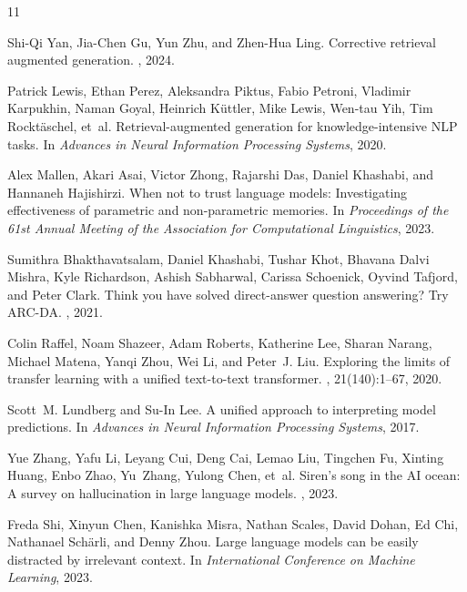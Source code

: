 \documentclass[11pt]{article}
\begin{document}
\begin{thebibliography}{11}

Shi-Qi Yan, Jia-Chen Gu, Yun Zhu, and Zhen-Hua Ling.
\newblock Corrective retrieval augmented generation.
, 2024.

Patrick Lewis, Ethan Perez, Aleksandra Piktus, Fabio Petroni, Vladimir Karpukhin, Naman Goyal,
Heinrich K\"{u}ttler, Mike Lewis, Wen-tau Yih, Tim Rockt\"{a}schel, et~al.
\newblock Retrieval-augmented generation for knowledge-intensive {NLP} tasks.
\newblock In {\em Advances in Neural Information Processing Systems}, 2020.

Alex Mallen, Akari Asai, Victor Zhong, Rajarshi Das, Daniel Khashabi, and Hannaneh Hajishirzi.
\newblock When not to trust language models: Investigating effectiveness of parametric and
  non-parametric memories.
\newblock In {\em Proceedings of the 61st Annual Meeting of the Association for Computational
  Linguistics}, 2023.

Sumithra Bhakthavatsalam, Daniel Khashabi, Tushar Khot, Bhavana Dalvi Mishra, Kyle Richardson,
Ashish Sabharwal, Carissa Schoenick, Oyvind Tafjord, and Peter Clark.
\newblock Think you have solved direct-answer question answering? {T}ry {ARC-DA}.
, 2021.

Colin Raffel, Noam Shazeer, Adam Roberts, Katherine Lee, Sharan Narang, Michael Matena, Yanqi
Zhou, Wei Li, and Peter~J. Liu.
\newblock Exploring the limits of transfer learning with a unified text-to-text transformer.
, 21(140):1--67, 2020.

Scott~M. Lundberg and Su-In Lee.
\newblock A unified approach to interpreting model predictions.
\newblock In {\em Advances in Neural Information Processing Systems}, 2017.

Yue Zhang, Yafu Li, Leyang Cui, Deng Cai, Lemao Liu, Tingchen Fu, Xinting Huang, Enbo Zhao,
Yu~Zhang, Yulong Chen, et~al.
\newblock Siren's song in the {AI} ocean: A survey on hallucination in large language models.
, 2023.

Freda Shi, Xinyun Chen, Kanishka Misra, Nathan Scales, David Dohan, Ed Chi, Nathanael
Sch\"{a}rli, and Denny Zhou.
\newblock Large language models can be easily distracted by irrelevant context.
\newblock In {\em International Conference on Machine Learning}, 2023.


\end{thebibliography}
\end{document}
